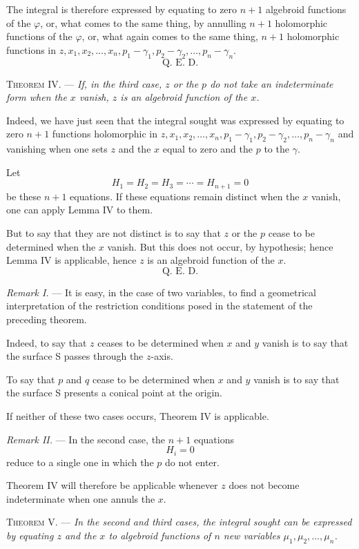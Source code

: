 \documentclass[11pt]{article}
\begin{document}
The integral is therefore expressed by equating to zero $n+1$ algebroid functions of the $\varphi$, or, what comes to the same thing, by annulling $n+1$ holomorphic functions of the $\varphi$, or, what again comes to the same thing, $n+1$ holomorphic functions in $z,x_1,x_2,\ldots,x_n,p_1-\gamma_1,p_2-\gamma_2,\ldots,p_n-\gamma_n$.
\[
\text{Q. E. D.}
\]

\medskip
\noindent\textsc{Theorem IV.} — \emph{If, in the third case, $z$ or the $p$ do not take an indeterminate form when the $x$ vanish, $z$ is an algebroid function of the $x$.}

Indeed, we have just seen that the integral sought was expressed by equating to zero $n+1$ functions holomorphic in $z,x_1,x_2,\ldots,x_n,p_1-\gamma_1,p_2-\gamma_2,\ldots,p_n-\gamma_n$ and vanishing when one sets $z$ and the $x$ equal to zero and the $p$ to the $\gamma$.

Let
\[
H_1=H_2=H_3=\cdots=H_{n+1}=0
\]
be these $n+1$ equations. If these equations remain distinct when the $x$ vanish, one can apply Lemma IV to them.

But to say that they are not distinct is to say that $z$ or the $p$ cease to be determined when the $x$ vanish. But this does not occur, by hypothesis; hence Lemma IV is applicable, hence $z$ is an algebroid function of the $x$.
\[
\text{Q. E. D.}
\]

\emph{Remark I.} — It is easy, in the case of two variables, to find a geometrical interpretation of the restriction conditions posed in the statement of the preceding theorem.

Indeed, to say that $z$ ceases to be determined when $x$ and $y$ vanish is to say that the surface S passes through the $z$-axis.

To say that $p$ and $q$ cease to be determined when $x$ and $y$ vanish is to say that the surface S presents a conical point at the origin.

If neither of these two cases occurs, Theorem IV is applicable.

\emph{Remark II.} — In the second case, the $n+1$ equations
\[
H_i=0
\]
reduce to a single one in which the $p$ do not enter.

Theorem IV will therefore be applicable whenever $z$ does not become indeterminate when one annuls the $x$.

\medskip
\noindent\textsc{Theorem V.} — \emph{In the second and third cases, the integral sought can be expressed by equating $z$ and the $x$ to algebroid functions of $n$ new variables $\mu_1,\mu_2,\ldots,\mu_n$.}
\end{document}
